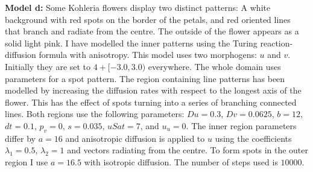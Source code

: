 \textbf{Model d:}
Some Kohleria flowers display two distinct patterns: A white background with red spots on the border of the petals, and red oriented lines that branch and radiate from the centre. The outside of the flower appears as a solid light pink. I have modelled the inner patterns using the Turing reaction-diffusion formula with anisotropy. This model uses two morphogens: $u$ and $v$. Initially they are set to $4 + [-3.0, 3.0)$ everywhere. The whole domain uses parameters for a spot pattern. The region containing line patterns has been modelled by increasing the diffusion rates with respect to the longest axis of the flower. This has the effect of spots turning into a series of branching connected lines. Both regions use the following parameters: $Du=0.3$, $Dv=0.0625$, $b=12$, $dt=0.1$, $p_v=0$, $s=0.035$, $uSat=7$, and $u_u=0$. The inner region parameters differ by $a=16$ and anisotropic diffusion is applied to $u$ using the coefficients $\lambda_{1}=0.5$, $\lambda_{2}=1$ and vectors radiating from the centre. To form spots in the outer region I use $a=16.5$ with isotropic diffusion. The number of steps used is $10000$.

\begin{table}[ht]
	\centering
	\caption {Parameter values for the California kingsnake model.}
	\label{tab:snakeParameters}
\end{table}

\begin{table}[ht]
	\centering
	\caption {Parameter values for the California kingsnake model.}
	\label{tab:snakeParameters}
\end{table}


